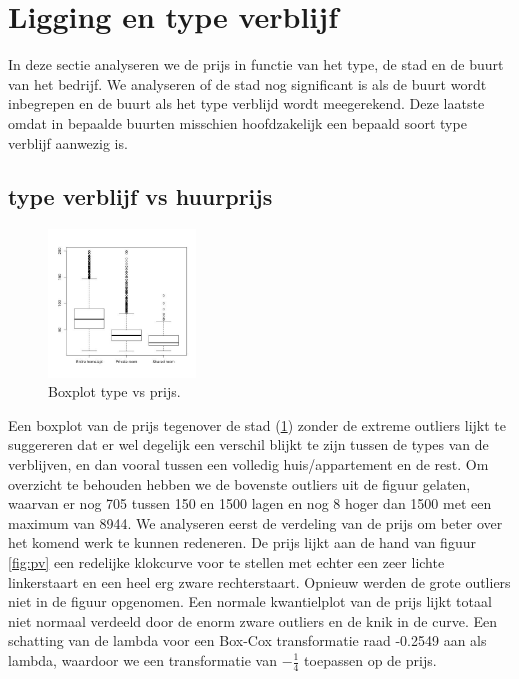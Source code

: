 \documentclass[a4paper,kulak]{kulakarticle} %
\begin{document}
\section{Ligging en type verblijf}
In deze sectie analyseren we de prijs in functie van het type, de stad en de buurt van het bedrijf.
We analyseren of de stad nog significant is als de buurt wordt inbegrepen en de buurt als het type verblijd wordt meegerekend.
Deze laatste omdat in bepaalde buurten misschien hoofdzakelijk een bepaald soort type verblijf aanwezig is.
\subsection{type verblijf vs huurprijs} \label{sec:pt}
\begin{figure}
	\begin{center}
		\includegraphics[width=0.35\textwidth]{boxplotPrijsCity.jpg}
	\end{center}
	\caption{Boxplot type vs prijs.}
	\label{fig:bpc}
\end{figure}
Een boxplot van de prijs tegenover de stad (\ref{fig:bpc}) zonder de extreme outliers lijkt te suggereren  dat er wel degelijk een verschil blijkt te zijn tussen de types van de verblijven, en dan vooral tussen een volledig huis/appartement en de rest.
Om overzicht te behouden hebben we de bovenste outliers uit de figuur gelaten, waarvan er nog 705 tussen 150 en 1500 lagen en nog 8 hoger dan 1500 met een maximum van 8944. 
We analyseren eerst de verdeling van de prijs om beter over het komend werk te kunnen redeneren.
De prijs lijkt aan de hand van figuur \ref{fig:pv} een redelijke klokcurve voor te stellen met echter een zeer lichte linkerstaart en een heel erg zware rechterstaart. 
Opnieuw werden de grote outliers niet in de figuur opgenomen.
Een normale kwantielplot van de prijs lijkt totaal niet normaal verdeeld door de enorm zware outliers en de knik in de curve. 
Een schatting van de lambda voor een Box-Cox transformatie raad -0.2549 aan als lambda, waardoor we een transformatie van $-\frac{1}{4}$ toepassen op de prijs.
\end{document}
